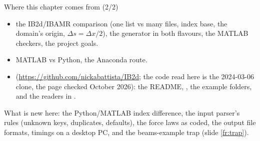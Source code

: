 \documentclass[aspectratio=169,11pt]{beamer}
\begin{document}
\begin{frame}{Where this chapter comes from (2/2)}
\label{fr:sources2}
\small
\begin{itemize}
  \item {} the IB2d/IBAMR comparison (one list vs many files, index base, the domain's origin, $\Delta s = \Delta x/2$), the generator in both flavours, the MATLAB checkers, the project goals.
  \item {} MATLAB vs Python, the Anaconda route.
  \item {} (\url{https://github.com/nickabattista/IB2d}; the code read here is the 2024-03-06 clone, the page checked October 2026): the README, , the example folders, and the readers in .
\end{itemize}
What is new here: the Python/MATLAB index difference, the input parser's rules (unknown keys, duplicates, defaults), the force laws as coded, the output file formats, timings on a desktop PC, and the beams-example trap (slide \ref{fr:trap}).
\end{frame}
\end{document}
